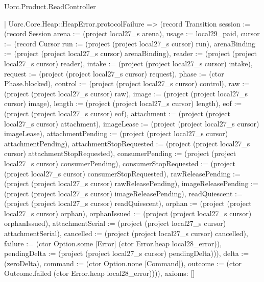\begin{lexlean}{Uorc.Product.ReadController}
\begin{semanticmodule}
{    | Uorc.Core.Heap::HeapError.protocolFailure => (record Transition {session := (record Session {arena := (project local27_s arena), usage := local29_paid, cursor := (record Cursor {run := (project (project local27_s cursor) run), arenaBinding := (project (project local27_s cursor) arenaBinding), reader := (project (project local27_s cursor) reader), intake := (project (project local27_s cursor) intake), request := (project (project local27_s cursor) request), phase := (ctor Phase.blocked), control := (project (project local27_s cursor) control), raw := (project (project local27_s cursor) raw), image := (project (project local27_s cursor) image), length := (project (project local27_s cursor) length), eof := (project (project local27_s cursor) eof), attachment := (project (project local27_s cursor) attachment), imageLease := (project (project local27_s cursor) imageLease), attachmentPending := (project (project local27_s cursor) attachmentPending), attachmentStopRequested := (project (project local27_s cursor) attachmentStopRequested), consumerPending := (project (project local27_s cursor) consumerPending), consumerStopRequested := (project (project local27_s cursor) consumerStopRequested), rawReleasePending := (project (project local27_s cursor) rawReleasePending), imageReleasePending := (project (project local27_s cursor) imageReleasePending), readQuiescent := (project (project local27_s cursor) readQuiescent), orphan := (project (project local27_s cursor) orphan), orphanIssued := (project (project local27_s cursor) orphanIssued), attachmentSerial := (project (project local27_s cursor) attachmentSerial), cancelled := (project (project local27_s cursor) cancelled), failure := (ctor Option.some [Error] (ctor Error.heap local28_error)), pendingDelta := (project (project local27_s cursor) pendingDelta)})}), delta := (zeroDelta), command := (ctor Option.none [Command]), outcome := (ctor Outcome.failed (ctor Error.heap local28_error))})),
  axioms: []
}


\end{semanticmodule}
\end{lexlean}

